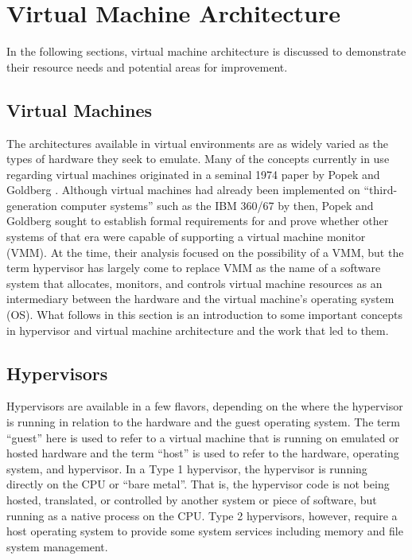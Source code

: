 
\section{Virtual Machine Architecture}
\label{sec:vmarchitecture}
In the following sections, virtual machine architecture is discussed to demonstrate their resource needs and potential areas for improvement.

\subsection{Virtual Machines}
\label{sec:virtualmachines}
The architectures available in virtual environments are as widely varied as the types of hardware they seek to emulate.
Many of the concepts currently in use regarding virtual machines originated in a seminal 1974 paper by Popek and Goldberg \autocite{_popek_1}.
Although virtual machines had already been implemented on ``third-generation computer systems'' such as the IBM 360/67 by then, Popek and Goldberg sought to establish formal requirements for and prove whether other systems of that era were capable of supporting a virtual machine monitor (VMM)\autocite{_popek_1}.
At the time, their analysis focused on the possibility of a VMM, but the term hypervisor has largely come to replace VMM as the name of a software system that allocates, monitors, and controls virtual machine resources as an intermediary between the hardware and the virtual machine's operating system (OS).
What follows in this section is an introduction to some important concepts in hypervisor and virtual machine architecture and the work that led to them.

\subsection{Hypervisors}
\label{sec:hypervisors}
Hypervisors are available in a few flavors, depending on the where the hypervisor is running in relation to the hardware and the guest operating system.
The term ``guest'' here is used to refer to a virtual machine that is running on emulated or hosted hardware and the term ``host'' is used to refer to the hardware, operating system, and hypervisor.  
In a Type 1 hypervisor, the hypervisor is running directly on the CPU or ``bare metal''.
That is, the hypervisor code is not being hosted, translated, or controlled by another system or piece of software, but running as a native process on the CPU.
Type 2 hypervisors, however, require a host operating system to provide some system services including memory and file system management.

